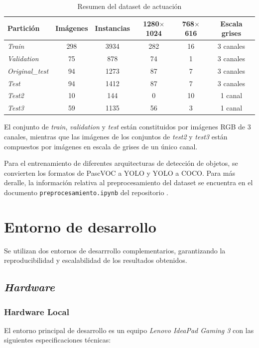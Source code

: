 \documentclass[12pt,a4paper,onecolumn,oneside]{report}
\begin{document}
\clearpage
\begin{table}[htbp]
\caption{Resumen del dataset de actuación}
\centering
{}
\begin{tabular}{l c c c c c}
\toprule
Partición & Imágenes & Instancias & 1280$\times$1024 & 768$\times$616 & Escala grises\\
\midrule
\textit{Train}          & 298 & 3934 & 282 & 16 & 3 canales\\
\textit{Validation}     &  75 &  878 & 74  & 1  & 3 canales\\
\textit{Original\_test} &  94 & 1273 & 87  & 7  & 3 canales\\
\textit{Test}           &  94 & 1412 & 87  & 7  & 3 canales\\
\textit{Test2}          &  10 &  144 & 0   & 10 & 1 canal\\
\textit{Test3}          &  59 & 1135 & 56  & 3  & 1 canal\\
\bottomrule
\end{tabular}
\label{tab:dataset_final}
\end{table}

El conjunto de \textit{train}, \textit{validation} y \textit{test} están constituidos por imágenes RGB de 3 canales, mientras que las imágenes 
de los conjuntos de \textit{test2} y \textit{test3} están compuestos por imágenes en escala de grises de un único canal. 

Para el entrenamiento de diferentes arquitecturas de detección de objetos, se convierten los formatos de PascVOC a YOLO y YOLO a COCO. 
Para más deralle, la información relativa al preprocesamiento del dataset se encuentra en el documento \texttt{preprocesamiento.ipynb} del repositorio \cite{repoTFM}.

\section{Entorno de desarrollo}
\label{sec:Entorno de desarrollo}
Se utilizan dos entornos de desarrrollo complementarios, garantizando la reproducibilidad y escalabilidad de los resultados obtenidos.

\subsection{\textit{Hardware}}
\subsubsection{Hardware Local}
\label{sec:hardware_local}
El entorno principal de desarrollo es un equipo \textit{Lenovo IdeaPad Gaming 3} con las siguientes especificaciones técnicas:
\end{document}
